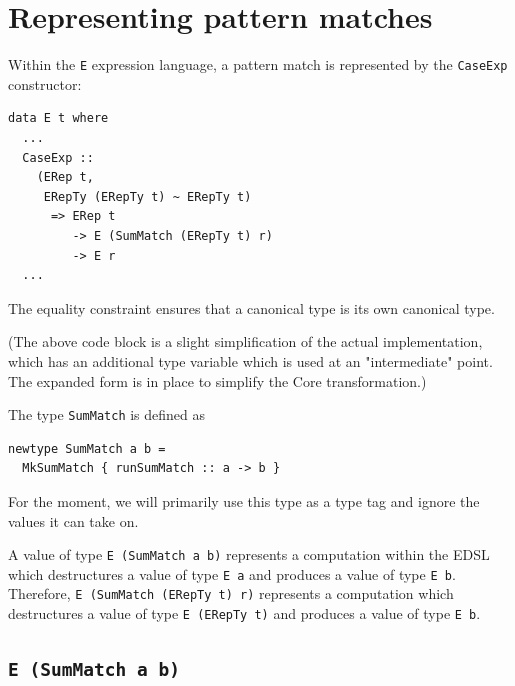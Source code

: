 \documentclass[sigplan,anonymous,review]{acmart}
\newcommand{\ttt}{\texttt}
\newcommand{\showtodos}{}  %
\newenvironment{todo}
  {\ifthenelse{\isundefined{\showtodos}}{\comment}{\begin{tcolorbox}
    \textbf{TODO}:}}
  {\ifthenelse{\isundefined{\showtodos}}{\endcomment}{\end{tcolorbox}}
  }
\begin{document}
\section{Representing pattern matches}
\label{sec:PatRep}

Within the \ttt{E} expression language, a pattern match is represented by the
\ttt{CaseExp} constructor:

\begin{lstlisting}
data E t where
  ...
  CaseExp ::
    (ERep t,
     ERepTy (ERepTy t) ~ ERepTy t)
      => ERep t
         -> E (SumMatch (ERepTy t) r)
         -> E r
  ...
\end{lstlisting}

The equality constraint ensures that a canonical type is its own canonical type.


(The above code block is a slight simplification of the actual implementation,
which has an additional type variable which is used at an "intermediate" point.
The expanded form is in place to simplify the Core transformation.)

The type \ttt{SumMatch} is defined as

\begin{lstlisting}
newtype SumMatch a b =
  MkSumMatch { runSumMatch :: a -> b }
\end{lstlisting}

For the moment, we will primarily use this type as a type tag and ignore
the values it can take on.

A value of type \ttt{E (SumMatch a b)} represents a computation within the EDSL
which destructures a value of type \ttt{E a} and produces a value of type \ttt{E b}.
Therefore, \ttt{E (SumMatch (ERepTy t) r)} represents a computation which destructures
a value of type \ttt{E (ERepTy t)} and produces a value of type \ttt{E b}.



\subsection{\ttt{E (SumMatch a b)}}
\end{document}

